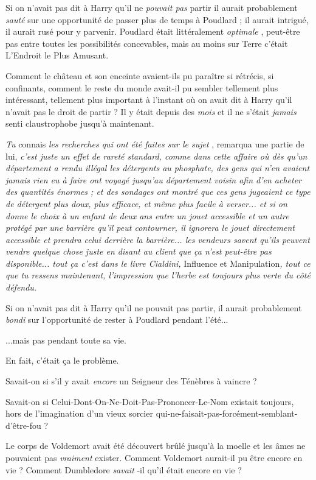 Si on n'avait pas dit à Harry qu'il ne \emph{pouvait pas}  partir il aurait probablement \emph{sauté}  sur une opportunité de passer plus de temps à Poudlard ; il aurait intrigué, il aurait rusé pour y parvenir. Poudlard était littéralement \emph{optimale} , peut-être pas entre toutes les possibilités concevables, mais au moins sur Terre c'était L'Endroit le Plus Amusant.

Comment le château et son enceinte avaient-ils pu paraître si rétrécis, si confinants, comment le reste du monde avait-il pu sembler tellement plus intéressant, tellement plus important à l'instant où on avait dit à Harry qu'il n'avait pas le droit de partir ? Il y était depuis des \emph{mois}  et il ne s'était \emph{jamais}  senti claustrophobe jusqu'à maintenant.

\emph{Tu } connais\emph{ les recherches qui ont été faites sur le sujet} , remarqua une partie de lui, \emph{c'est juste un effet de rareté standard, comme dans cette affaire où dès qu'un département a rendu illégal les détergents au phosphate, des gens qui n'en avaient jamais rien eu à faire ont voyagé jusqu'au département voisin afin d'en acheter des quantités énormes ; et des sondages ont montré que ces gens jugeaient ce type de détergent plus doux, plus efficace, et même plus facile à verser... et si on donne le choix à un enfant de deux ans entre un jouet accessible et un autre protégé par une barrière qu'il peut contourner, il ignorera le jouet directement accessible et prendra celui derrière la barrière... les vendeurs savent qu'ils peuvent vendre quelque chose juste en disant au client que ça n'est peut-être pas disponible... tout ça c'est dans le livre Cialdini, } Influence et Manipulation\emph{, tout ce que tu ressens maintenant, l'impression que l'herbe est toujours plus verte du côté défendu.} 

Si on n'avait pas dit à Harry qu'il ne pouvait pas partir, il aurait probablement \emph{bondi } sur l'opportunité de rester à Poudlard pendant l'été...

...mais pas pendant toute sa vie.

En fait, c'était ça le problème.

Savait-on si s'il y avait \emph{encore}  un Seigneur des Ténèbres à vaincre ?

Savait-on si Celui-Dont-On-Ne-Doit-Pas-Prononcer-Le-Nom existait toujours, hors de l'imagination d'un vieux sorcier qui-ne-faisait-pas-forcément-semblant-d'être-fou ?

Le corps de Voldemort avait été découvert brûlé jusqu'à la moelle et les âmes ne pouvaient pas \emph{vraiment}  exister. Comment Voldemort aurait-il pu être encore en vie ? Comment Dumbledore \emph{savait} -il qu'il était encore en vie ?

